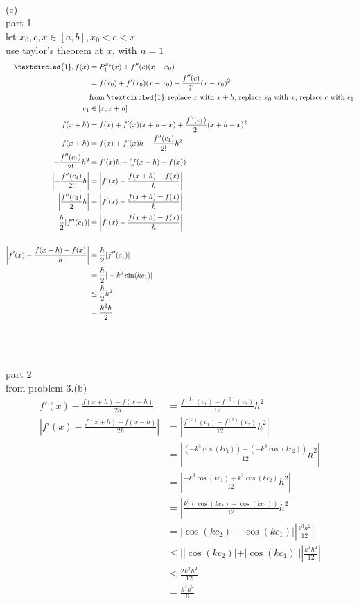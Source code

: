 \documentclass[12pt, border = 4pt, multi]{article} %
\begin{document}
\\
\\
\\
(c)\\
part 1\\
let $x_0, c, x \in [a, b], x_0 < c < x$\\
use taylor's theorem at $x$, with $n = 1$\\
\begin{align*}
\textcircled{1}, f(x) &= P_1 ^ {x_0}(x) + f''(c)(x - x_0)\\
&= f(x_0) + f'(x_0)(x - x_0) + \frac{f''(c)}{2!}(x - x_0) ^ 2\\
&\text{from }\textcircled{1}, \text{replace $x$ with $x + h$, replace $x_0$ with $x$, replace $c$ with $c_1$}\\
c_1 &\in [x, x + h]\\
f(x + h) &= f(x) + f'(x)(x + h - x) + \frac{f''(c_1)}{2!}(x + h - x) ^ 2\\
f(x + h) &= f(x) + f'(x)h + \frac{f''(c_1)}{2!}h ^ 2\\
-\frac{f''(c_1)}{2!}h ^ 2 &= f'(x)h - (f(x + h) - f(x))\\
\left|-\frac{f''(c_1)}{2!}h\right| &= \left|f'(x) - \frac{f(x + h) - f(x)}{h}\right|\\
\left|\frac{f''(c_1)}{2}h\right| &= \left|f'(x) - \frac{f(x + h) - f(x)}{h}\right|\\
\frac{h}{2}|f''(c_1)| &= \left|f'(x) - \frac{f(x + h) - f(x)}{h}\right|\\
\\
\left|f'(x) - \frac{f(x + h) - f(x)}{h}\right| &= \frac{h}{2}|f''(c_1)|\\
&= \frac{h}{2}|-k ^ 2\sin(kc_1)|\\
&\leq\frac{h}{2} k ^ 2\\
&= \frac{k ^ 2 h}{2}\\
\end{align*}
\\
\\
\\
part 2\\
from problem 3.(b)
\begin{align*}
f'(x) - \frac{f(x + h) - f(x - h)}{2h} &= \frac{f ^ {(3)}(c_1) - f ^ {(3)}(c_2)}{12}h ^ 2\\
\left|f'(x) - \frac{f(x + h) - f(x - h)}{2h}\right| &= \left|\frac{f ^ {(3)}(c_1) - f ^ {(3)}(c_2)}{12}h ^ 2\right|\\
&= \left|\frac{(-k ^ 3\cos(kc_1)) - (-k ^ 3\cos(kc_2))}{12}h ^ 2\right|\\
&= \left|\frac{-k ^ 3\cos(kc_1) + k ^ 3\cos(kc_2)}{12}h ^ 2\right|\\
&= \left|\frac{k ^ 3(\cos(kc_2) - \cos(kc_1))}{12}h ^ 2\right|\\
&= |\cos(kc_2) - \cos(kc_1)|\left|\frac{k ^ 3 h ^ 2}{12}\right|\\
&\leq ||\cos(kc_2)| + |\cos(kc_1)||\left|\frac{k ^ 3 h ^ 2}{12}\right|\\
&\leq \frac{2 k ^ 3 h ^ 2}{12}\\
&= \frac{k ^ 3 h ^ 2}{6}\\
\end{align*}
\end{document}
